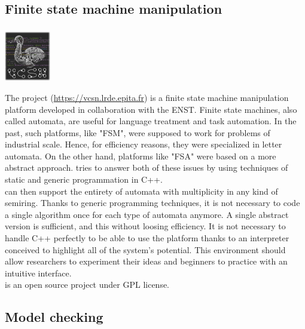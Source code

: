\subsection{Finite state machine manipulation}
\subsubsection{\VCSN}
\begin{center}
 \includegraphics[width=2cm]{img/vcsn.png}
\end{center}
The \VCSN project (\url{https://vcsn.lrde.epita.fr}) is a finite state machine manipulation
platform developed in collaboration with the ENST. Finite state machines, also called automata,
are useful for language treatment and task automation. In the past, such platforms, like "FSM",
were supposed to work for problems of industrial scale. Hence, for efficiency reasons, they were
specialized in letter automata. On the other hand, platforms like "FSA" were based on a more abstract
approach. \VCSN tries to answer both of these issues by using techniques of static and generic
programmation in C++.\\

\VCSN can then support the entirety of automata with multiplicity in any kind of
semiring. Thanks to generic programming techniques, it is not necessary to code a single algorithm once
for each type of automata anymore. A single abstract version is sufficient, and this without loosing
efficiency. It is not necessary to handle C++ perfectly to be able to use the platform thanks to an
interpreter conceived to highlight all of the system's potential. This environment should allow
researchers to experiment their ideas and beginners to practice with an intuitive interface.\\

\VCSN is an open source project under GPL license.


\subsection{Model checking}
